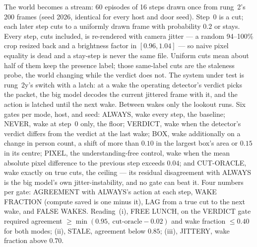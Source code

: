 \documentclass[11pt]{article}
\begin{document}
The world becomes a stream: 60 episodes of 16 steps drawn once from
rung~2's 200 frames (seed 2026, identical for every host and door
seed). Step~0 is a cut; each later step cuts to a uniformly drawn frame
with probability $0.2$ or stays. Every step, cuts included, is
re-rendered with camera jitter --- a random 94--100\% crop resized back
and a brightness factor in $[0.96, 1.04]$ --- so naive pixel equality is
dead and a stay-step is never the same file. Uniform cuts mean about
half of them keep the presence label; those same-label cuts are the
staleness probe, the world changing while the verdict does not. The
system under test is rung~2y's switch with a latch: at a wake the
operating detector's verdict picks the packet, the big model decodes
the current jittered frame with it, and the action is latched until the
next wake. Between wakes only the lookout runs. Six gates per mode,
host, and seed: ALWAYS, wake every step, the baseline; NEVER, wake at
step~0 only, the floor; VERDICT, wake when the detector's verdict
differs from the verdict at the last wake; BOX, wake additionally on a
change in person count, a shift of more than $0.10$ in the largest
box's area or $0.15$ in its centre; PIXEL, the understanding-free
control, wake when the mean absolute pixel difference to the previous
step exceeds $0.04$; and CUT-ORACLE, wake exactly on true cuts, the
ceiling --- its residual disagreement with ALWAYS is the big model's own
jitter-instability, and no gate can beat it. Four numbers per gate:
AGREEMENT with ALWAYS's action at each step, WAKE FRACTION (compute
saved is one minus it), LAG from a true cut to the next wake, and FALSE
WAKES. Reading~(i), FREE LUNCH, on the VERDICT gate required agreement
$\ge \min(0.95,\ \text{cut-oracle} - 0.02)$ and wake fraction $\le 0.40$
for both modes; (ii), STALE, agreement below $0.85$; (iii), JITTERY,
wake fraction above $0.70$.
\end{document}
